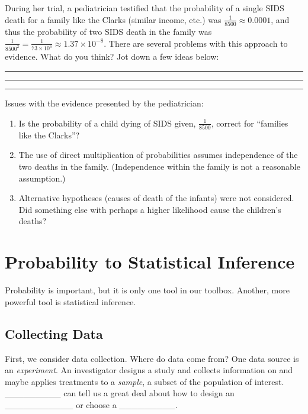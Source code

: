 \documentclass[]{book}
\providecommand{\tightlist}{%
  \setlength{\itemsep}{0pt}\setlength{\parskip}{0pt}}
\theoremstyle{definition}
\theoremstyle{definition}
\theoremstyle{remark}
\begin{document}
During her trial, a pediatrician testified that the probability of a
single SIDS death for a family like the Clarks (similar income, etc.)
was \(\frac{1}{8500}\approx 0.0001\), and thus the probability of two
SIDS death in the family was
\(\frac{1}{8500^2} = \frac{1}{73 \times 10^6} \approx 1.37 \times 10^{-8}\).
There are several problems with this approach to evidence. What do you
think? Jot down a few ideas below: \vspace{.1in}

\rule{\textwidth}{.4pt}

\vspace{.1in}

\rule{\textwidth}{.4pt}

\vspace{.1in}

\rule{\textwidth}{.4pt}

\vspace{.1in}

Issues with the evidence presented by the pediatrician:

\begin{enumerate}
\def\labelenumi{\arabic{enumi}.}
\tightlist
\item
  Is the probability of a child dying of SIDS given, \(\frac{1}{8500}\),
  correct for ``families like the Clarks''?
\item
  The use of direct multiplication of probabilities assumes independence
  of the two deaths in the family. (Independence within the family is
  not a reasonable assumption.)
\item
  Alternative hypotheses (causes of death of the infants) were not
  considered. Did something else with perhaps a higher likelihood cause
  the children's deaths?
\end{enumerate}

\section{Probability to Statistical
Inference}\label{probability-to-statistical-inference}

Probability is important, but it is only one tool in our toolbox.
Another, more powerful tool is statistical inference.

\subsection{Collecting Data}\label{collecting-data}

First, we consider data collection. Where do data come from? One data
source is an \emph{experiment}. An investigator designs a study and
collects information on and maybe applies treatments to a \emph{sample},
a subset of the population of interest. \_\_\_\_\_\_\_\_\_ can tell us a
great deal about how to design an \_\_\_\_\_\_\_\_\_\_\_ or choose a
\_\_\_\_\_\_\_\_\_.
\end{document}
